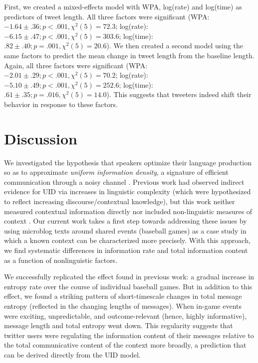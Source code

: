 \documentclass[11pt,letterpaper]{article}
\begin{document}
First, we created a mixed-effects model with WPA, log(rate) and log(time) as predictors of tweet length.  All three factors were significant (WPA: $-1.64 \pm .36; p<.001, \chi^2(5)=72.3$; log(rate): $-6.15 \pm .47; p<.001, \chi^2(5) =303.6 $; log(time): $.82 \pm .40; p=.001, \chi^2(5)=20.6$).  We then created a second model using the same factors to predict the mean change in tweet length from the baseline length. Again, all three factors were significant (WPA: $-2.01 \pm .29; p<.001, \chi^2(5)=70.2$; log(rate): $-5.10 \pm .49; p<.001, \chi^2(5) = 252.6$; log(time): $.61 \pm .35; p=.016, \chi^2(5)=14.0$).  This suggests that tweeters indeed shift their behavior in response to these factors.


\section{Discussion}

We investigated the hypothesis that speakers optimize their language production so as to approximate \emph{uniform information density}, a signature of efficient communication through a noisy channel \cite{shannon1948,levy2007}. Previous work had observed indirect evidence for UID via increases in linguistic complexity (which were hypothesized to reflect increasing discourse/contextual knowledge), but this work neither measured contextual information directly nor included non-linguistic measures of context \cite{genzel2002,genzel2003,qian2012}. Our current work takes a first step towards addressing these issues by using microblog texts around shared events (baseball games) as a case study in which a known context can be characterized more precisely. With this approach, we find systematic differences in information rate and total information content as a function of nonlinguistic factors. 

We successfully replicated the effect found in previous work: a gradual increase in entropy rate over the course of individual baseball games. But in addition to this effect, we found a striking pattern of short-timescale changes in total message entropy (reflected in the changing lengths of messages). When in-game events were exciting, unpredictable, and outcome-relevant (hence, highly informative), message length and total entropy went down. This regularity suggests that twitter users were regulating the information content of their messages relative to the total communicative content of the context more broadly, a prediction that can be derived directly from the UID model. 
\end{document}
